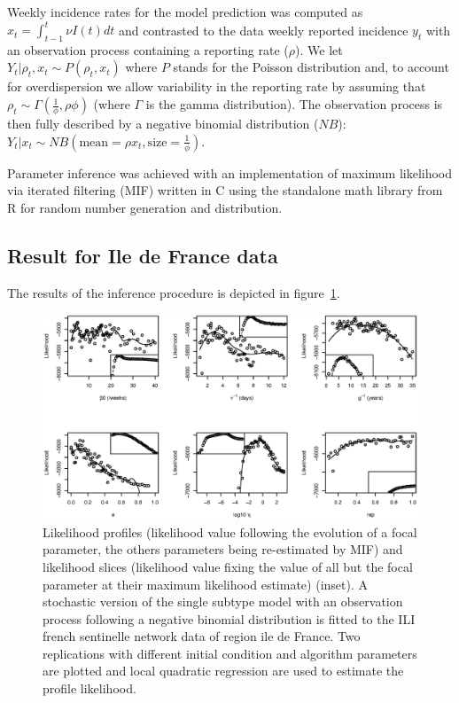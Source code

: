 \documentclass[12pt]{article}
\begin{document}
Weekly incidence rates for the model prediction was computed as
$x_t=\int_{t-1}^t \nu I(t) dt$ and contrasted to the data weekly
reported incidence $y_t$ with an observation process containing a
reporting rate ($\rho$). We let $Y_t | \rho_t,x_t \sim P(\rho_t,x_t)$
where $P$ stands for the Poisson distribution and, to account for
overdispersion we allow variability in the reporting rate by assuming
that $\rho_t \sim \Gamma(\frac{1}{\phi}, \rho \phi)$ (where $\Gamma$
is the gamma distribution).  The observation process is then fully
described by a negative binomial distribution ($NB$): $Y_t | x_t \sim
NB(\mathrm{mean}=\rho x_t, \mathrm{size}=\frac{1}{\phi})$.

Parameter inference was achieved with an implementation of maximum
likelihood via iterated filtering (MIF) \citep{Ionides2006, Breto2009}
written in C using the standalone math library from R \citep{R2008}
for random number generation and distribution.



\subsection{Result for Ile de France data}

The results of the inference procedure is depicted in
figure~\ref{fig:profile}.

\begin{figure}[htb]
  \center
    \includegraphics[width= 0.9 \linewidth]{graph_annexe/profile.eps}
    \caption{Likelihood profiles (likelihood value following the
      evolution of a focal parameter, the others parameters being
      re-estimated by MIF) and likelihood slices (likelihood value
      fixing the value of all but the focal parameter at their maximum
      likelihood estimate) (inset). A stochastic version of the single
      subtype model with an observation process following a negative
      binomial distribution is fitted to the ILI french sentinelle
      network data of region ile de France. Two replications with
      different initial condition and algorithm parameters are plotted
      and local quadratic regression are used to estimate the profile
      likelihood.}
  \label{fig:profile}
\end{figure}
\end{document}

